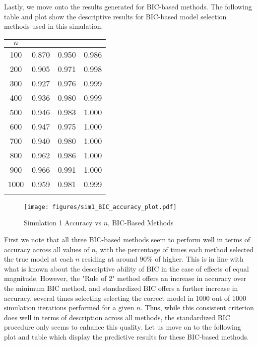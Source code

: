 		Lastly, we move onto the results generated for BIC-based methods. The following table and plot show the descriptive results for BIC-based model selection methods used
		in this simulation.

		\begin{table}[H]
			\centering
			\small\addtolength{\tabcolsep}{-3pt}
			\setlength\extrarowheight{-3pt}
			{
			\begin{tabular}{ c|c|c|c}
			$n$ & \vtop{\hbox{\strut Minimum BIC}\hbox{\strut Accuracy}} & \vtop{\hbox{\strut BIC Rule of 2}\hbox{\strut Accuracy}} & \vtop{\hbox{\strut Standardized BIC} \hbox{\strut Accuracy}} \\
			 \hline
			 100 & 0.870 & 0.950 & 0.986 \\
			 200 & 0.905 & 0.971 & 0.998 \\
			 300 & 0.927 & 0.976 & 0.999 \\
			 400 & 0.936 & 0.980 & 0.999 \\
			 500 & 0.946 & 0.983 & 1.000 \\
			 600 & 0.947 & 0.975 & 1.000 \\
			 700 & 0.940 & 0.980 & 1.000 \\
			 800 & 0.962 & 0.986 & 1.000 \\
			 900 & 0.966 & 0.991 & 1.000 \\
			1000 & 0.959 & 0.981 & 0.999 \\
			 \Xhline{3\arrayrulewidth}
			\end{tabular}
			}
		\end{table}

		\begin{figure}[H]
			\centering
			\captionsetup{justification=centering}
			\texttt{[image: figures/sim1\_BIC\_accuracy\_plot.pdf]}
			\caption{\label{fig:sim1_bic_accuracy_plot} Simulation 1 Accuracy vs $n$, BIC-Based Methods}
		\end{figure}

		First we note that all three BIC-based methods seem to perform well in terms of accuracy across all values of $n$, with the percentage of times each method selected the true model
		at each $n$ residing at around 90\% of higher. This is in line with what is known about the descriptive ability of BIC in the case of effects of equal magnitude. However, the
		"Rule of 2" method offers an increase in accuracy over the minimum BIC method, and standardized BIC offers a further increase in accuracy, several times selecting selecting the
		correct model in 1000 out of 1000 simulation iterations performed for a given $n$. Thus, while this consistent criterion does well in terms of description across all methods, the
		standardized BIC procedure only seems to enhance this quality. Let us move on to the following plot and table which display the predictive results for these BIC-based methods.

